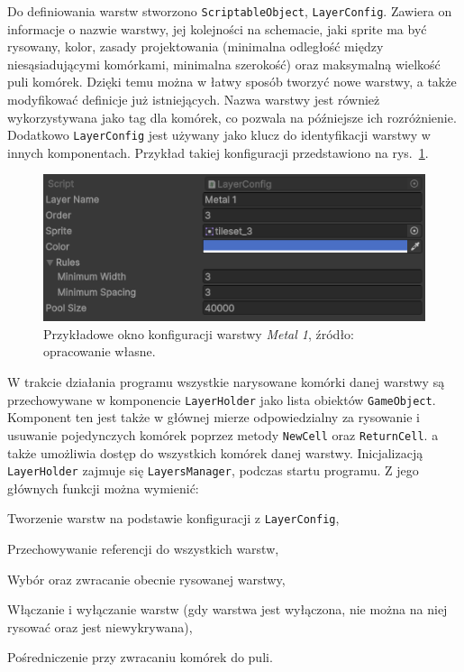 \indent Do definiowania warstw stworzono \texttt{ScriptableObject}, \texttt{LayerConfig}.\linebreak
Zawiera on informacje o nazwie warstwy, jej kolejności na schemacie, jaki sprite ma być rysowany, kolor,
zasady projektowania (minimalna odległość między niesąsiadującymi komórkami, minimalna szerokość)
oraz maksymalną wielkość puli komórek.
Dzięki temu można w łatwy sposób tworzyć nowe warstwy, a także modyfikować definicje już istniejących.
Nazwa warstwy jest również wykorzystywana jako tag dla komórek, co pozwala na późniejsze ich rozróżnienie.
Dodatkowo \texttt{LayerConfig} jest używany jako klucz do identyfikacji warstwy w innych komponentach.
Przykład takiej konfiguracji przedstawiono na rys.~\ref{fig:layer_config}.

\begin{figure}[h]
    \centering
    \includegraphics[width=.9\textwidth]{chapters/chapter4/rys/layer_config}
    \caption[Przykładowe okno konfiguracji warstwy \textit{Metal 1}.]
    {Przykładowe okno konfiguracji warstwy \textit{Metal 1}, źródło: opracowanie własne.}
    \label{fig:layer_config}
\end{figure}

\indent W trakcie działania programu wszystkie narysowane komórki danej warstwy
są przechowywane w komponencie \texttt{LayerHolder} jako lista obiektów \texttt{GameObject}.
Komponent ten jest także w głównej mierze odpowiedzialny za rysowanie
i usuwanie pojedynczych komórek poprzez metody \texttt{NewCell} oraz \texttt{ReturnCell}.
a także umożliwia dostęp do wszystkich komórek danej warstwy.
Inicjalizacją \texttt{LayerHolder} zajmuje się \texttt{LayersManager}, podczas startu programu.
Z jego głównych funkcji można wymienić:

\begin{citemize}
    \item Tworzenie warstw na podstawie konfiguracji z \texttt{LayerConfig},
    \item Przechowywanie referencji do wszystkich warstw,
    \item Wybór oraz zwracanie obecnie rysowanej warstwy,
    \item Włączanie i wyłączanie warstw (gdy warstwa jest wyłączona, nie można na niej rysować oraz jest niewykrywana),
    \item Pośredniczenie przy zwracaniu komórek do puli.
\end{citemize}



